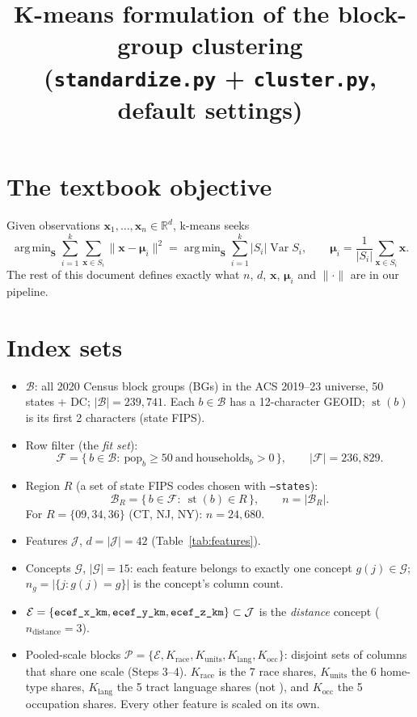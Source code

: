 \documentclass[11pt]{article}
\title{K-means formulation of the block-group clustering\\
\large (\texttt{standardize.py} + \texttt{cluster.py}, default settings)}
\date{}
\newcommand{\R}{\mathbb{R}}
\newcommand{\x}{\mathbf{x}}
\newcommand{\bmu}{\boldsymbol{\mu}}
\newcommand{\argmin}{\mathop{\operatorname{arg\,min}}}
\newcommand{\Var}{\operatorname{Var}}
\newcommand{\st}{\operatorname{st}}
\newcommand{\ft}[1]{\texttt{\detokenize{#1}}}
\begin{document}
\maketitle

\section{The textbook objective}

Given observations $\x_1,\dots,\x_n\in\R^d$, k-means seeks
\begin{equation}
\argmin_{\mathbf S}\sum_{i=1}^{k}\sum_{\x\in S_i}\bigl\|\x-\bmu_i\bigr\|^2
=\argmin_{\mathbf S}\sum_{i=1}^{k}|S_i|\Var S_i,
\qquad
\bmu_i=\frac{1}{|S_i|}\sum_{\x\in S_i}\x .
\label{eq:wiki}
\end{equation}
The rest of this document defines exactly what $n$, $d$, $\x$, $\bmu_i$ and
$\|\cdot\|$ are in our pipeline.

\section{Index sets}

\begin{itemize}
\item $\mathcal B$: all 2020 Census block groups (BGs) in the ACS 2019--23 universe,
  50 states + DC; $|\mathcal B| = 239{,}741$. Each $b\in\mathcal B$ has a 12-character GEOID;
  $\st(b)$ is its first 2 characters (state FIPS).
\item Row filter (the \emph{fit set}):
  \[
  \mathcal F=\{\,b\in\mathcal B:\ \mathrm{pop}_b\ge 50\ \text{and}\ \mathrm{households}_b>0\,\},
  \qquad |\mathcal F| = 236{,}829 .
  \]
\item Region $R$ (a set of state FIPS codes chosen with \texttt{--states}):
  \[
  \mathcal B_R=\{\,b\in\mathcal F:\ \st(b)\in R\,\},\qquad n=|\mathcal B_R| .
  \]
  For $R=\{09,34,36\}$ (CT, NJ, NY): $n=24{,}680$.
\item Features $\mathcal J$, $d=|\mathcal J|=42$ (Table~\ref{tab:features}).
\item Concepts $\mathcal G$, $|\mathcal G|=15$: each feature belongs to exactly one concept
  $g(j)\in\mathcal G$; $n_g=|\{j:g(j)=g\}|$ is the concept's column count.
\item $\mathcal E=\{\ft{ecef_x_km},\ft{ecef_y_km},\ft{ecef_z_km}\}\subset\mathcal J$ is the
  \emph{distance} concept ($n_{\text{distance}}=3$).
\item Pooled-scale blocks
  $\mathcal P=\{\mathcal E,K_{\text{race}},K_{\text{units}},K_{\text{lang}},K_{\text{occ}}\}$:
  disjoint sets of columns that share one scale (Steps 3--4). $K_{\text{race}}$ is the 7 race
  shares, $K_{\text{units}}$ the 6 home-type shares, $K_{\text{lang}}$ the 5 tract
  language shares (not \ft{lep_hh_share}), and $K_{\text{occ}}$ the 5 occupation shares. Every
  other feature is scaled on its own.
\end{itemize}
\end{document}
